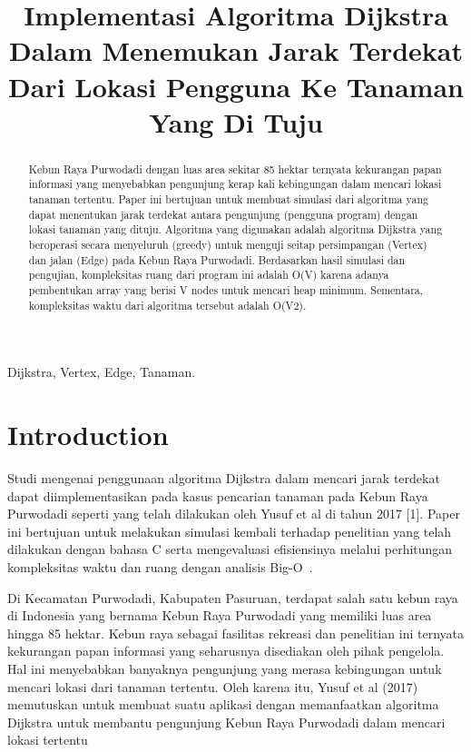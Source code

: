 \documentclass[conference]{IEEEtran}
\title{Implementasi Algoritma Dijkstra Dalam Menemukan Jarak Terdekat Dari Lokasi Pengguna Ke Tanaman Yang Di Tuju}
\author{\IEEEauthorblockN{Radithya Arisaputra}
\IEEEauthorblockA{\textit{School of Electrical Engineering and Informatics}\\
\textit{Institut Teknologi Bandung}\\
Bandung, Indonesia\\
13220053@std.stei.itb.ac.id}
}
\begin{document}
\maketitle

\begin{abstract}
    Kebun Raya Purwodadi dengan luas area sekitar 85 hektar ternyata kekurangan papan informasi yang menyebabkan pengunjung kerap kali kebingungan dalam mencari lokasi tanaman tertentu. Paper ini bertujuan untuk membuat simulasi dari algoritma yang dapat menentukan jarak terdekat antara pengunjung (pengguna program) dengan lokasi tanaman yang dituju. Algoritma yang digunakan adalah algoritma Dijkstra yang beroperasi secara menyeluruh (greedy) untuk menguji seitap persimpangan (Vertex) dan jalan (Edge) pada Kebun Raya Purwodadi. Berdasarkan hasil simulasi dan pengujian, kompleksitas ruang dari program ini adalah O(V) karena adanya pembentukan array yang berisi V nodes untuk mencari heap minimum. Sementara, kompleksitas waktu dari algoritma tersebut adalah O(V2).
\end{abstract}

\begin{IEEEkeywords}
    Dijkstra, Vertex, Edge, Tanaman.
\end{IEEEkeywords}

\section{Introduction}
Studi mengenai penggunaan algoritma Dijkstra dalam mencari jarak terdekat dapat diimplementasikan pada kasus pencarian tanaman pada Kebun Raya Purwodadi seperti yang telah dilakukan oleh Yusuf et al di tahun 2017 [1]. Paper ini bertujuan untuk melakukan simulasi kembali terhadap penelitian yang telah dilakukan dengan bahasa C serta mengevaluasi efisiensinya melalui perhitungan kompleksitas waktu dan ruang dengan analisis Big-O~\cite{yusuf2017implementasi}.

Di Kecamatan Purwodadi, Kabupaten Pasuruan, terdapat salah satu kebun raya di Indonesia yang bernama Kebun Raya Purwodadi yang memiliki luas area hingga 85 hektar. Kebun raya sebagai fasilitas rekreasi dan penelitian ini ternyata kekurangan papan informasi yang seharusnya disediakan oleh pihak pengelola. Hal ini menyebabkan banyaknya pengunjung yang merasa kebingungan untuk mencari lokasi dari tanaman tertentu. Oleh karena itu, Yusuf et al (2017) memutuskan untuk membuat suatu aplikasi dengan memanfaatkan algoritma Dijkstra untuk membantu pengunjung Kebun Raya Purwodadi dalam mencari lokasi tertentu
\end{document}
